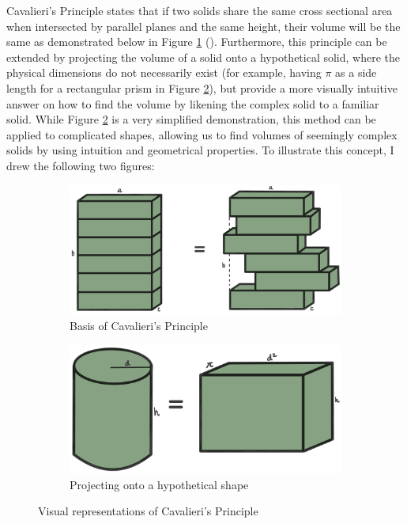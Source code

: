 \documentclass[12pt]{article}
\begin{document}
Cavalieri's Principle states that if two solids share the same cross sectional area when intersected by parallel planes and the same height, their volume will be the same as demonstrated below in Figure \ref{fig:cavasimp} (\citeauthor{cavalieri_1653}). Furthermore, this principle can be extended by projecting the volume of a solid onto a hypothetical solid, where the physical dimensions do not necessarily exist (for example, having $\pi$ as a side length for a rectangular prism in Figure \ref{fig:cavahypo}), but provide a more visually intuitive answer on how to find the volume by likening the complex solid to a familiar solid. While Figure \ref{fig:cavahypo} is a very simplified demonstration, this method can be applied to complicated shapes, allowing us to find volumes of seemingly complex solids by using intuition and geometrical properties. To illustrate this concept, I drew  the following two figures: \\

\begin{figure}[h]
     \centering
     \begin{subfigure}[b]{0.45\textwidth}
         \centering
         \includegraphics[width=\textwidth]{images/cava1.jpg}
         \caption{Basis of Cavalieri's Principle}
         \label{fig:cavasimp}
     \end{subfigure}
     \hfill
     \begin{subfigure}[b]{0.45\textwidth}
         \centering
         \includegraphics[width=\textwidth]{images/cava2.jpg}
         \caption{Projecting onto a hypothetical shape}
         \label{fig:cavahypo}
     \end{subfigure}
     \hfill
        \caption{Visual representations of Cavalieri's Principle}
        \label{fig:cava}
\end{figure}
\end{document}
